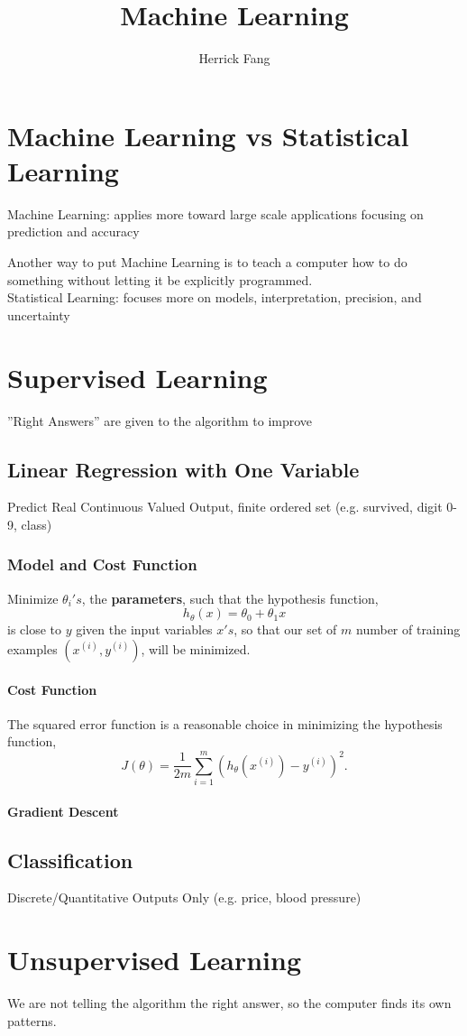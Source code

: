 \documentclass{article}
\title{Machine Learning}
\author{Herrick Fang}
\date{ }
\begin{document}
\maketitle

\tableofcontents

\section{Machine Learning vs Statistical Learning}
Machine Learning: applies more toward large scale applications focusing on prediction and accuracy

Another way to put Machine Learning is to teach a computer how to do something without letting it be  explicitly programmed.
\\
Statistical Learning: focuses more on models, interpretation, precision, and uncertainty

\section{Supervised Learning}
''Right Answers'' are given to the algorithm to improve  

\subsection{Linear Regression with One Variable}
Predict Real Continuous Valued Output, finite ordered set (e.g. survived, digit 0-9, class)

\subsubsection{Model and Cost Function}
Minimize $\theta_{i}'s$, the {\bf parameters}, such that the hypothesis function,
\begin{equation}
     \label{eq:hypothesis_function}
     h_{\theta}(x) = \theta_{0} + \theta_{1}x
\end{equation}
is close to $y$ given the input variables $x's$, so that our set of $m$ number of training examples  $\left( x^{\left( i \right)}, y^{\left( i \right)} \right) $, will be minimized.

\paragraph{Cost Function}
The squared error function is a reasonable choice in minimizing the hypothesis function,
\begin{equation}
    \label{eq:cost_function}
    J(\theta) = \frac{1}{2m}\sum_{i=1}^{m}(h_\theta(x^{(i)}) - y^{(i)})^2.
\end{equation}


\paragraph{Gradient Descent}




\subsection{Classification}
Discrete/Quantitative Outputs Only (e.g. price, blood pressure)

\section{Unsupervised Learning}
We are not telling the algorithm the right answer, so the computer finds its own patterns.
\end{document}
